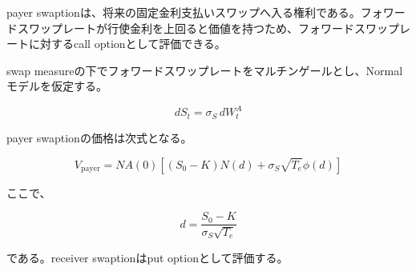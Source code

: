 \documentclass[
  letterpaper,
  DIV=11,
  numbers=noendperiod]{scrreprt}
\begin{document}
payer
swaptionは、将来の固定金利支払いスワップへ入る権利である。フォワードスワップレートが行使金利を上回ると価値を持つため、フォワードスワップレートに対するcall
optionとして評価できる。

swap
measureの下でフォワードスワップレートをマルチンゲールとし、Normalモデルを仮定する。

\[
dS_t
=
\sigma_S\,dW_t^A
\]

payer swaptionの価格は次式となる。

\[
V_{\mathrm{payer}}
=
NA(0)
\left[
(S_0-K)N(d)
+
\sigma_S\sqrt{T_e}\phi(d)
\right]
\]

ここで、

\[
d
=
\frac{
S_0-K
}{
\sigma_S\sqrt{T_e}
}
\]

である。receiver swaptionはput optionとして評価する。
\end{document}
